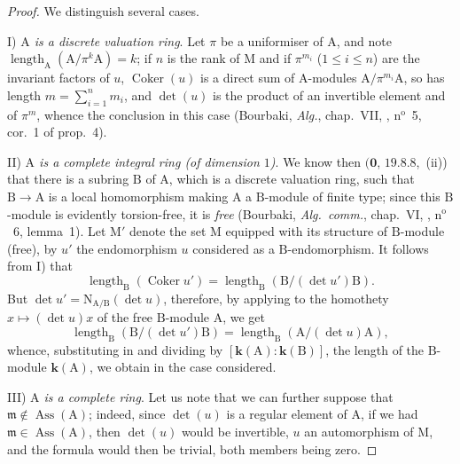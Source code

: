 \begin{proof}
We distinguish several cases.

I) \emph{$\mathrm{A}$ is a discrete valuation ring}.
Let $\pi$ be a uniformiser of $\mathrm{A}$, and note $\operatorname{length}_{\mathrm{A}}(\mathrm{A}/\pi^k\mathrm{A})=k$; if $n$ is the rank of $\mathrm{M}$ and if $\pi^{m_i}$ ($1\leq i\leq n$) are the invariant factors of $u$, $\operatorname{Coker}(u)$ is a direct sum of A-modules $\mathrm{A}/\pi^{m_i}\mathrm{A}$, so has length $m=\sum_{i=1}^n m_i$, and $\det(u)$ is the product of an invertible element and of $\pi^m$, whence the conclusion in this case (Bourbaki, \emph{Alg.}, chap.~VII, , n$^{\mathrm{o}}$~5, cor.~1 of prop.~4).

II) \emph{$\mathrm{A}$ is a complete integral ring (of dimension $1$)}.
We know then $(\mathbf{0}$, $19.8.8$,~(ii)) that there is a subring $\mathrm{B}$ of $\mathrm{A}$, which is a discrete valuation ring, such that $\mathrm{B}\to\mathrm{A}$ is a local homomorphism making $\mathrm{A}$ a $\mathrm{B}$-module of finite type; since this $\mathrm{B}$-module is evidently torsion-free, it is \emph{free} (Bourbaki, \emph{Alg.\ comm.}, chap.~VI, , n$^{\mathrm{o}}$~6, lemma~1).
Let $\mathrm{M}'$ denote the set $\mathrm{M}$ equipped with its structure of $\mathrm{B}$-module (free), by $u'$ the endomorphism $u$ considered as a $\mathrm{B}$-endomorphism.
It follows from I) that
\[
\label{IV.21.10.17.5}
  \operatorname{length}_{\mathrm{B}}(\operatorname{Coker} u')=\operatorname{length}_{\mathrm{B}}(\mathrm{B}/(\det u')\mathrm{B}).
  \tag{21.10.17.5}
\]
But $\det u'=\mathrm{N}_{\mathrm{A}/\mathrm{B}}(\det u)$, therefore, by applying  to the homothety $x\mapsto(\det u)x$ of the free $\mathrm{B}$-module $\mathrm{A}$, we get
\[
  \operatorname{length}_{\mathrm{B}}(\mathrm{B}/(\det u')\mathrm{B})=\operatorname{length}_{\mathrm{B}}(\mathrm{A}/(\det u)\mathrm{A}),
\]
whence, substituting in  and dividing by $[\boldsymbol{k}(\mathrm{A}):\boldsymbol{k}(\mathrm{B})]$, the length of the $\mathrm{B}$-module $\boldsymbol{k}(\mathrm{A})$, we obtain  in the case considered.

III) \emph{$\mathrm{A}$ is a complete ring}.
Let us note that we can further suppose that $\mathfrak{m}\notin\operatorname{Ass}(\mathrm{A})$; indeed, since $\det(u)$ is a regular element of $\mathrm{A}$, if we had $\mathfrak{m}\in\operatorname{Ass}(\mathrm{A})$, then $\det(u)$ would be invertible, $u$ an automorphism of $\mathrm{M}$, and the formula  would then be trivial, both members being zero.


\end{proof}
